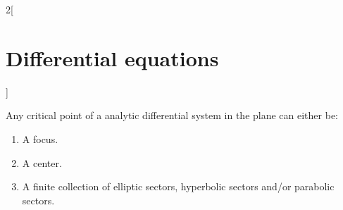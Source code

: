 \documentclass[../../../main.tex]{subfiles}
\begin{document}
\begin{multicols}{2}[\section{Differential equations}]
\begin{definition}
\begin{center}
\begin{minipage}[b]{0.475\linewidth}
        \label{DE_apsector}
      \end{minipage}\hfill
      \begin{minipage}[b]{0.475\linewidth}
        \centering
        
        \label{DE_rpsector}
      \end{minipage}
    \end{center}
  \end{definition}
  \begin{proposition}
    Any critical point of a analytic differential system in the plane can either be:
    \begin{enumerate}
      \item A focus.
      \item A center.
      \item A finite collection of elliptic sectors, hyperbolic sectors and/or parabolic sectors.
    \end{enumerate}
  \end{proposition}

\end{multicols}
\end{document}
